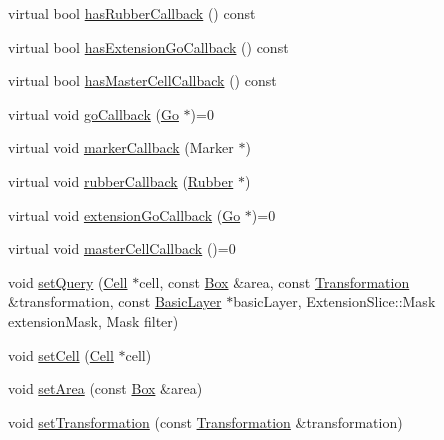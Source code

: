 \begin{DoxyCompactItemize}
\item 
virtual bool \mbox{\hyperlink{classHurricane_1_1Query_a5d49250d46dea1542bc3034f3eb1daee}{has\+Rubber\+Callback}} () const
\item 
virtual bool \mbox{\hyperlink{classHurricane_1_1Query_abd8ff8d187e4499e625feb12c68e9b29}{has\+Extension\+Go\+Callback}} () const
\item 
virtual bool \mbox{\hyperlink{classHurricane_1_1Query_a7ebb7b16bab183cd4508dc5639bd12ab}{has\+Master\+Cell\+Callback}} () const
\item 
virtual void \mbox{\hyperlink{classHurricane_1_1Query_a59007148bd0afa0405801f341e7e4139}{go\+Callback}} (\mbox{\hyperlink{classHurricane_1_1Go}{Go}} $\ast$)=0
\item 
virtual void \mbox{\hyperlink{classHurricane_1_1Query_a4ad5bf076073f107189d4b7ee48f040e}{marker\+Callback}} (Marker $\ast$)
\item 
virtual void \mbox{\hyperlink{classHurricane_1_1Query_acec322581e35c1556ce706aa5ea66aa3}{rubber\+Callback}} (\mbox{\hyperlink{classHurricane_1_1Rubber}{Rubber}} $\ast$)
\item 
virtual void \mbox{\hyperlink{classHurricane_1_1Query_a75b87e969b64caaf24ec058c0d2dfa68}{extension\+Go\+Callback}} (\mbox{\hyperlink{classHurricane_1_1Go}{Go}} $\ast$)=0
\item 
virtual void \mbox{\hyperlink{classHurricane_1_1Query_abaf97e93c7fa96469adf64f7865938b4}{master\+Cell\+Callback}} ()=0
\item 
void \mbox{\hyperlink{classHurricane_1_1Query_a63c50b61799b729ff4b2e7e291959b4d}{set\+Query}} (\mbox{\hyperlink{classHurricane_1_1Cell}{Cell}} $\ast$cell, const \mbox{\hyperlink{classHurricane_1_1Box}{Box}} \&area, const \mbox{\hyperlink{classHurricane_1_1Transformation}{Transformation}} \&transformation, const \mbox{\hyperlink{classHurricane_1_1BasicLayer}{Basic\+Layer}} $\ast$basic\+Layer, Extension\+Slice\+::\+Mask extension\+Mask, Mask filter)
\item 
void \mbox{\hyperlink{classHurricane_1_1Query_a36378e1604e484450a3ccee0ececcff7}{set\+Cell}} (\mbox{\hyperlink{classHurricane_1_1Cell}{Cell}} $\ast$cell)
\item 
void \mbox{\hyperlink{classHurricane_1_1Query_ac41de6b1535c256c4929c075769890b1}{set\+Area}} (const \mbox{\hyperlink{classHurricane_1_1Box}{Box}} \&area)
\item 
void \mbox{\hyperlink{classHurricane_1_1Query_a885360fc2f351fc3612c7dda363b5131}{set\+Transformation}} (const \mbox{\hyperlink{classHurricane_1_1Transformation}{Transformation}} \&transformation)

\end{DoxyCompactItemize}
